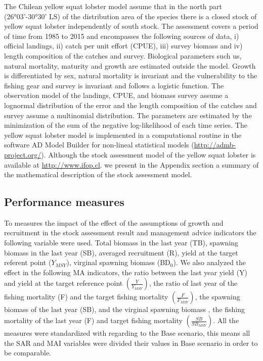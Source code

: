 \documentclass[11pt,letter,]{article}
\begin{document}
The Chilean yellow squat lobster model assume that in the north part
(26°03'-30°30' LS) of the distribution area of the species there is a
closed stock of yellow squat lobster independently of south stock. The
assessment covers a period of time from 1985 to 2015 and encompasses the
following sources of data, i) official landings, ii) catch per unit
effort (CPUE), iii) survey biomass and iv) length composition of the
catches and survey. Biological parameters such us, natural mortality,
maturity and growth are estimated outside the model. Growth is
differentiated by sex, natural mortality is invariant and the
vulnerability to the fishing gear and survey is invariant and follows a
logistic function. The observation model of the landings, CPUE, and
biomass survey assume a lognormal distribution of the error and the
length composition of the catches and survey assume a multinomial
distribution. The parameters are estimated by the minimization of the
sum of the negative log-likelihood of each time series. The yellow squat
lobster model is implemented in a computational routine in the software
AD Model Builder for non-lineal statistical models
(\url{http://admb-project.org/}). Although the stock assessment model of
the yellow squat lobster is available at \url{http://www.ifop.cl}. we
present in the Appendix section a summary of the mathematical
description of the stock assessment model.

\subsection{Performance measures}\label{performance-measures}

To measures the impact of the effect of the assumptions of growth and
recruitment in the stock assessment result and management advice
indicators the following variable were used. Total biomass in the last
year (TB), spawning biomass in the last year (SB), averaged recruitment
(R), yield at the target referent point (\(Y_{MSY}\)), virginal spawning
biomass (BD\(_0\)). We also analyzed the effect in the following MA
indicators, the ratio between the last year yield (Y) and yield at the
target reference point \(\left(\frac{Y}{Y_{MSY}}\right)\), the ratio of
last year of the fishing mortality (F) and the target fishing mortality
\(\left(\frac{F}{F_{MSY}}\right)\), the spawning biomass of the last
year (SB), and the virginal spawning biomass , the fishing mortality of
the last year (F) and target fishing mortality
\(\left(\frac{SB}{SB_{MSY}}\right)\). All the measures were standardized
with regarding to the Base scenario, this means all the SAR and MAI
variables were divided their values in Base scenario in order to be
comparable.
\end{document}
